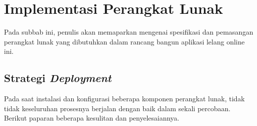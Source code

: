 
\section{Implementasi Perangkat Lunak}
Pada subbab ini, penulis akan memaparkan mengenai spesifikasi dan pemasangan perangkat lunak yang dibutuhkan dalam rancang bangun aplikasi lelang online ini.
  
  
\subsection{Strategi \textit{Deployment}}
Pada saat instalasi dan konfigurasi beberapa komponen perangkat lunak, tidak tidak keseluruhan prosesnya berjalan dengan baik dalam sekali percobaan. Berikut paparan beberapa kesulitan dan penyelesaiannya.
	  
	
	
	
	
  
  
  
  
  
  

